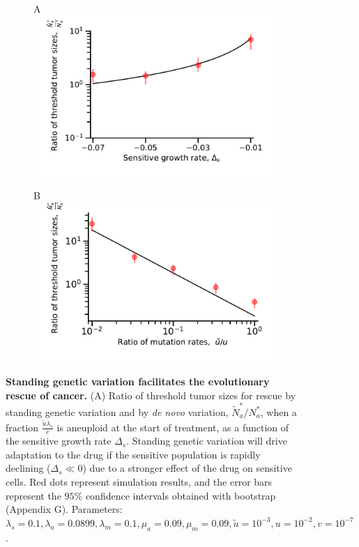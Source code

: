\documentclass[12pt]{extarticle}
\begin{document}
\begin{figure}
\begin{subfigure}{0.5\textwidth}
A\\
\includegraphics[width=1\textwidth]{Figures/RatiodsPlot.pdf}
\end{subfigure}
\begin{subfigure}{0.5\textwidth}
B\\
\includegraphics[width=1\textwidth]{Figures/ratio_uPlot.pdf}
\end{subfigure}
\caption{
\textbf{Standing genetic variation facilitates the evolutionary rescue of cancer.}
(A)  Ratio of threshold tumor sizes for rescue by standing genetic variation and by \textit{de novo} variation, $\tilde{N}_a^*/N_a^*$, when a fraction $\frac{\tilde{u}\lambda_s}{c}$ is aneuploid at the start of treatment, as a function of the sensitive growth rate $\Delta_s$.  Standing genetic variation will drive adaptation to the drug if the sensitive population is rapidly declining ($\Delta_s\ll0$) due to a stronger effect of the drug on sensitive cells. Red dots represent simulation results, and the error bars represent the $95\%$ confidence intervals obtained with bootstrap (Appendix G). Parameters: $\lambda_s=0.1,\lambda_a=0.0899,\lambda_m=0.1,\mu_a=0.09,\mu_m=0.09,\tilde{u}=10^{-3},u=10^{-2}, v=10^{-7}$.
}
\end{figure}
\end{document}
